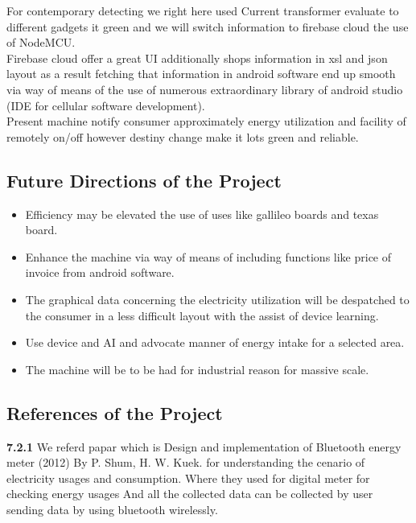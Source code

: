 \documentclass[12pt,a4paper]{article}
\begin{document}
For contemporary detecting we right here used Current transformer evaluate to different gadgets it green and we will switch information to firebase cloud the use of NodeMCU.\\

Firebase cloud offer a great UI additionally shops information in xsl and json layout as a result fetching that information in android software end up smooth via way of means of the use of numerous extraordinary library of android studio (IDE for cellular software development).\\

Present machine notify consumer approximately energy utilization and facility of remotely on/off however destiny change make it lots green and reliable.\\


\subsection{Future Directions of the Project}

\begin{itemize}
	\item Efficiency may be elevated the use of uses like gallileo boards and texas board.
	\item Enhance the machine via way of means of including functions like price of invoice from android software.
	\item The graphical data concerning the electricity utilization will be despatched to the consumer in a less difficult layout with the assist of device learning.
	\item Use device and AI and advocate manner of energy intake for a selected area.
	\item The machine will be to be had for industrial reason for massive scale.
\end{itemize}

\subsection{References of the Project}

\hspace{0.5cm} \textbf{7.2.1} We referd papar which is Design and implementation of Bluetooth energy meter (2012)
By P. Shum, H. W. Kuek. for understanding the cenario of electricity usages and consumption. Where they used for digital meter for checking energy usages And all the collected data can be collected by user sending data by using bluetooth wirelessly.\\
\end{document}

